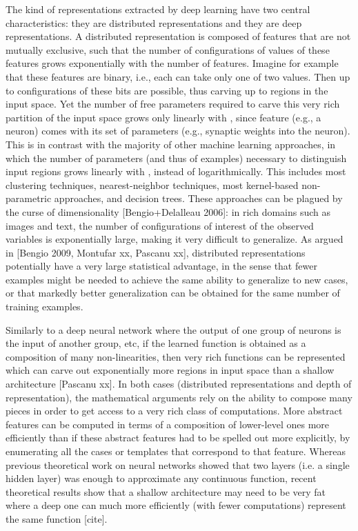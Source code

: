 \documentclass{article} %
\begin{document}
The kind of representations extracted by deep learning have two central
characteristics: they are distributed representations and they are deep
representations. A distributed representation is composed of features that
are not mutually exclusive, such that the number of configurations of
values of these features grows exponentially with the number of
features. Imagine for example that these features are binary, i.e., each
can take only one of two values. Then up to configurations of these bits
are possible, thus carving up to regions in the input space. Yet the number
of free parameters required to carve this very rich partition of the input
space grows only linearly with , since feature (e.g., a neuron) comes with
its set of parameters (e.g., synaptic weights into the neuron). This is in
contrast with the majority of other machine learning approaches, in which
the number of parameters (and thus of examples) necessary to distinguish
input regions grows linearly with , instead of logarithmically. This
includes most clustering techniques, nearest-neighbor techniques, most
kernel-based non-parametric approaches, and decision trees. These
approaches can be plagued by the curse of dimensionality [Bengio+Delalleau
  2006]: in rich domains such as images and text, the number of
configurations of interest of the observed variables is exponentially
large, making it very difficult to generalize. As argued in [Bengio 2009,
  Montufar xx, Pascanu xx], distributed representations potentially have a
very large statistical advantage, in the sense that fewer examples might be
needed to achieve the same ability to generalize to new cases, or that
markedly better generalization can be obtained for the same number of
training examples.


Similarly to a deep neural network where the output of one group of neurons
is the input of another group, etc, if the learned function is obtained as
a composition of many non-linearities, then very rich functions can be
represented which can carve out exponentially more regions in input space
than a shallow architecture [Pascanu xx]. In both cases (distributed
representations and depth of representation), the mathematical arguments
rely on the ability to compose many pieces in order to get access to a very
rich class of computations. More abstract features can be computed in terms
of a composition of lower-level ones more efficiently than if these
abstract features had to be spelled out more explicitly, by enumerating all
the cases or templates that correspond to that feature. Whereas previous
theoretical work on neural networks showed that two layers (i.e. a single
hidden layer) was enough to approximate any continuous function, recent
theoretical results show that a shallow architecture may need to be very
fat where a deep one can much more efficiently (with fewer computations)
represent the same function [cite].
\end{document}
